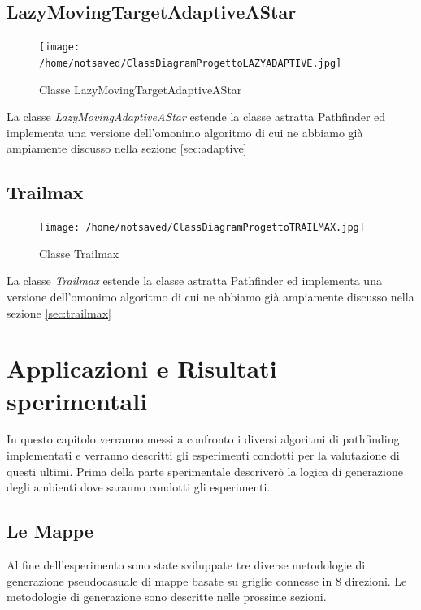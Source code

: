 \documentclass[12pt]{book}
\begin{document}
\section{LazyMovingTargetAdaptiveAStar}
\begin{figure}[H]
\centering
\texttt{[image: /home/notsaved/ClassDiagramProgettoLAZYADAPTIVE.jpg]}
\caption{Classe LazyMovingTargetAdaptiveAStar}
\label{classlazyadaptive}
\end{figure}



La classe \emph{LazyMovingAdaptiveAStar} estende la classe astratta Pathfinder ed implementa una versione dell'omonimo algoritmo di cui ne abbiamo gi\`a ampiamente discusso nella sezione \ref{sec:adaptive}

\section{Trailmax}

\begin{figure}[H]
\centering
\texttt{[image: /home/notsaved/ClassDiagramProgettoTRAILMAX.jpg]}
\caption{Classe Trailmax}
\label{classtrailmax}
\end{figure}

La classe \emph{Trailmax} estende la classe astratta Pathfinder ed implementa una versione dell'omonimo algoritmo di cui ne abbiamo gi\`a ampiamente discusso nella sezione \ref{sec:trailmax}
\fi
\chapter{Applicazioni e Risultati sperimentali}

\par{In questo capitolo verranno messi a confronto i diversi algoritmi di pathfinding implementati e verranno descritti gli esperimenti condotti per la valutazione di questi ultimi. Prima della parte sperimentale descriver\`o la logica di generazione degli ambienti dove saranno condotti gli esperimenti.
}

\section{Le Mappe}

Al fine dell'esperimento sono state sviluppate tre diverse metodologie di generazione pseudocasuale di mappe basate su griglie connesse in 8 direzioni. Le metodologie di generazione sono descritte nelle prossime sezioni.
\end{document}
